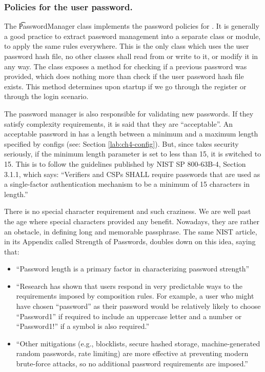 \subsubsection{Policies for the user password.} \label{lab:ch4-password}

The \t{PasswordManager} class implements the password policies for \app{}.
It is generally a good practice to extract password management into a separate class or module, to apply the same rules everywhere.
This is the only class which uses the user password hash file, no other classes shall read from or write to it, or modify it in any way.
The class exposes a method for checking if a previous password was provided, which does nothing more than check if the user password hash file exists.
This method determines upon startup if we go through the register or through the login scenario.

The password manager is also responsible for validating new passwords.
If they satisfy complexity requirements, it is said that they are ``acceptable''.
An acceptable password in \app{} has a length between a minimum and a maximum length specified by configs (see: Section \ref{lab:ch4-config}).
But, since \app{} takes security seriously, if the minimum length parameter is set to less than 15, it is switched to 15.
This is to follow the guidelines published by NIST SP 800-63B-4, Section 3.1.1, which says:
``Verifiers and CSPs SHALL require passwords that are used as a single-factor authentication mechanism to be a minimum of 15 characters in length.''\cite{nist-password-length}

There is no special character requirement and such craziness.
We are well past the age where special characters provided any benefit.
Nowadays, they are rather an obstacle, in defining long and memorable passphrase.
The same NIST article, in its Appendix called Strength of Passwords, doubles down on this idea, saying that:
\begin{itemize}
  \item
    ``Password length is a primary factor in characterizing password strength''
  \item
    ``Research has shown that users respond in very predictable ways to the requirements imposed by composition rules.
    For example, a user who might have chosen “password” as their password would be relatively likely to choose “Password1” if required to include an uppercase letter and a number or “Password1!” if a symbol is also required.''
  \item
    ``Other mitigations (e.g., blocklists, secure hashed storage, machine-generated random passwords, rate limiting) are more effective at preventing modern brute-force attacks, so no additional password requirements are imposed.''
\end{itemize}

